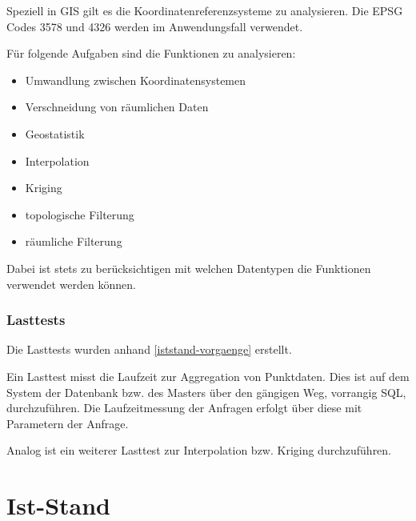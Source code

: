 Speziell in GIS gilt es die Koordinatenreferenzsysteme zu analysieren.
Die EPSG Codes 3578 und 4326 werden im Anwendungsfall verwendet.

Für folgende Aufgaben sind die Funktionen zu analysieren:
\begin{itemize}
\item Umwandlung zwischen Koordinatensystemen
\item Verschneidung von räumlichen Daten
\item Geostatistik
\item Interpolation
\item Kriging
\item topologische Filterung
\item räumliche Filterung
\end{itemize}
Dabei ist stets zu berücksichtigen mit welchen Datentypen die Funktionen verwendet werden können.


\subsubsection{Lasttests}
Die Lasttests wurden anhand \ref{iststand-vorgaenge} erstellt.

Ein Lasttest misst die Laufzeit zur Aggregation von Punktdaten.
Dies ist auf dem System der Datenbank bzw. des Masters über den gängigen Weg, vorrangig SQL, durchzuführen.
Die Laufzeitmessung der Anfragen erfolgt über diese mit Parametern der Anfrage.

Analog ist ein weiterer Lasttest zur Interpolation bzw. Kriging durchzuführen.

\section{Ist-Stand}
\label{IstStand}

